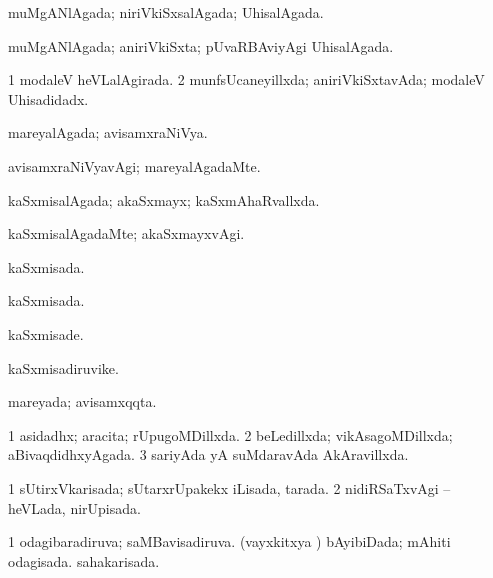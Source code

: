 {\bentry
{} 
\gl{\gu}
\expl{}
\bmng
 muMgANlAgada; niriVkiSxsalAgada; UhisalAgada. 
\emng
\eentry

\bentry
{} 
\gl{\gu}
\expl{}
\bmng
 muMgANlAgada; aniriVkiSxta; pUvaRBAviyAgi UhisalAgada. 
\emng
\eentry

\bentry
{} 
\gl{\gu}
\expl{}
\bmng
\bnum
\num{1} modaleV heVLalAgirada. 
\num{2} munfsUcaneyillxda; aniriVkiSxtavAda; modaleV Uhisadidadx. 
\enum
\emng
\eentry

\bentry
{} 
\gl{\gu}
\expl{}
\bmng
 mareyalAgada; avisamxraNiVya. 
\emng
\eentry

\bentry
{} 
\gl{\kirxvi}
\expl{}
\bmng
 avisamxraNiVyavAgi; mareyalAgadaMte. 
\emng
\eentry

\bentry
{} 
\gl{\gu}
\expl{}
\bmng
 kaSxmisalAgada; akaSxmayx; kaSxmAhaRvallxda. 
\emng
\eentry

\bentry
{} 
 \gl{\kirxvi} \bmng
kaSxmisalAgadaMte; akaSxmayxvAgi. 
\emng
\eentry

\bentry
{} 
 \gl{\gu} \bmng
 kaSxmisada. 
\emng
\eentry

\bentry
{} 
 \gl{\gu} \bmng
kaSxmisada. 
\emng
\eentry

\bentry
{} 
 \gl{\kirxvi} \bmng
kaSxmisade. 
\emng
\eentry

\bentry
{} 
 \gl{\nA} \bmng
 kaSxmisadiruvike. 
\emng
\eentry

\bentry
{} 
\gl{\gu}
\expl{}
\bmng
mareyada; avisamxqqta. 
\emng
\eentry

\bentry
{} 
\gl{\gu}
\expl{}
\bmng
\bnum
\num{1} asidadhx; aracita; rUpugoMDillxda. 
\num{2} beLedillxda; vikAsagoMDillxda; aBivaqdidhxyAgada. 
\num{3} sariyAda yA suMdaravAda AkAravillxda. 
\enum
\emng
\eentry

\bentry
{} 
\gl{\gu}
\expl{}
\bmng
\bnum
\num{1} sUtirxVkarisada; sUtarxrUpakekx iLisada, tarada. 
\num{2} nidiRSaTxvAgi -- heVLada, nirUpisada. 
\enum
\emng
\eentry

\bentry
{} 
\gl{\gu}
\expl{}
\bmng
\bnum
\num{1} odagibaradiruva; saMBavisadiruva. 
 (vayxkitxya \vi) 
\banum
{} bAyibiDada; mAhiti odagisada. 
 sahakarisada. 
\eanum
\numie
\enum
\emng
\eentry

}

